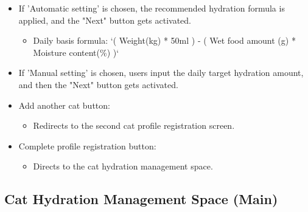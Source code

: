 \documentclass[conference]{IEEEtran}
\begin{document}
\begin{itemize}
\begin{itemize}
        \item If 'Automatic setting' is chosen, the recommended hydration formula is applied, and the "Next" button gets activated.
        \begin{itemize}
            \item Daily basis formula: `( Weight(kg) * 50ml ) - ( Wet food amount (g) * Moisture content(\%) )`
        \end{itemize}
        \item If 'Manual setting' is chosen, users input the daily target hydration amount, and then the "Next" button gets activated.
        \item Add another cat button:
        \begin{itemize}
            \item Redirects to the second cat profile registration screen.
        \end{itemize}
        \item Complete profile registration button:
        \begin{itemize}
            \item Directs to the cat hydration management space.\\
        \end{itemize}
    \end{itemize}
\end{itemize}

\subsection{Cat Hydration Management Space (Main)}
\end{document}
